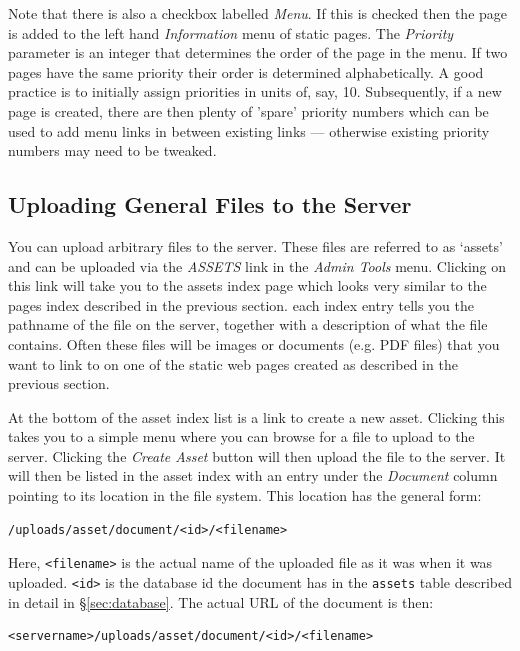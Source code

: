 \documentclass[12pt,twoside]{article}
\begin{document}
Note that there is also a checkbox labelled \emph{Menu}. If this is
checked then the page is added to the left hand \emph{Information} menu
of static pages. The \emph{Priority} parameter is an integer that
determines the order of the page in the menu. If two pages have the same
priority their order is determined alphabetically.
A good practice is to initially assign priorities in units of, say, 10.
Subsequently, if a new page is created, there are then plenty of 'spare'
priority numbers which can be used to add menu links in between
existing links --- otherwise existing priority numbers may need to be tweaked.

\subsection{Uploading General Files to the Server}
You can upload arbitrary files to the server. These files are referred
to as `assets' and can be uploaded via the \emph{ASSETS} link in the
\emph{Admin Tools} menu. Clicking on this link will take you to the
assets index page which looks very similar to the pages index described
in the previous section.
each index entry tells you the pathname of the file on the server,
together with a description of what the file contains. Often these files
will be images or documents (e.g. PDF files) that you want to link to
on one of the static web pages created as described in the previous
section.

At the bottom of the asset index list is a link to create a new asset.
Clicking this takes you to a simple menu where you can browse for a file
to upload to the server. Clicking the \emph{Create Asset} button will
then upload the file to the server. It will then be listed in the
asset index with an entry under the \emph{Document} column pointing
to its location in the file system. This location has the general form:
\begin{verbatim}
/uploads/asset/document/<id>/<filename>
\end{verbatim}
Here, \verb=<filename>= is the actual name of the uploaded file as it was
when it was uploaded. \verb=<id>= is the database id the document has
in the \verb=assets= table described in detail in \S\ref{sec:database}.
The actual URL of the document is then:
\begin{verbatim}
<servername>/uploads/asset/document/<id>/<filename>
\end{verbatim}
\end{document}
